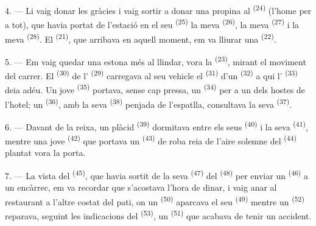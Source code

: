4. --- Li vaig donar les gràcies i vaig sortir a donar una propina al
 \textsuperscript{(24)} (l'home per a tot), que havia portat de
l'estació en el seu  \textsuperscript{(25)} la meva
 \textsuperscript{(26)}, la meva 
\textsuperscript{(27)} i la meva  \textsuperscript{(28)}. El
 \textsuperscript{(21)}, que arribava en aquell moment, em va lliurar
una  \textsuperscript{(22)}.

5. --- Em vaig quedar una estona més al llindar, vora la 
\textsuperscript{(23)}, mirant el moviment del carrer. El 
\textsuperscript{(30)} de l' \textsuperscript{(29)} carregava al seu
vehicle el  \textsuperscript{(31)} d'un 
\textsuperscript{(32)} a qui l' \textsuperscript{(33)} deia adéu. Un
jove  \textsuperscript{(35)} portava, sense cap pressa, un
 \textsuperscript{(34)} per a un dels hostes de l'hotel; un
 \textsuperscript{(36)}, amb la seva 
\textsuperscript{(38)} penjada de l'espatlla, consultava la seva 
\textsuperscript{(37)}.

\VUsaut{4.0mm}
\VUsaut{3.0mm}

6. --- Davant de la reixa, un plàcid  \textsuperscript{(39)}
dormitava entre els seus  \textsuperscript{(40)} i la
seva  \textsuperscript{(41)}, mentre una jove
 \textsuperscript{(42)} que portava un 
\textsuperscript{(43)} de roba reia de l'aire solemne del 
\textsuperscript{(44)} plantat vora la porta.

7. --- La vista del  \textsuperscript{(45)}, que havia sortit de la
seva  \textsuperscript{(47)} del 
\textsuperscript{(48)} per enviar un  \textsuperscript{(46)} a un
encàrrec, em va recordar que s'acostava l'hora de dinar, i vaig anar al
restaurant a l'altre costat del pati, on un 
\textsuperscript{(50)} aparcava el seu  \textsuperscript{(49)}
mentre un  \textsuperscript{(52)} reparava, seguint les indicacions
del  \textsuperscript{(53)}, un 
\textsuperscript{(51)} que acabava de tenir un accident.

